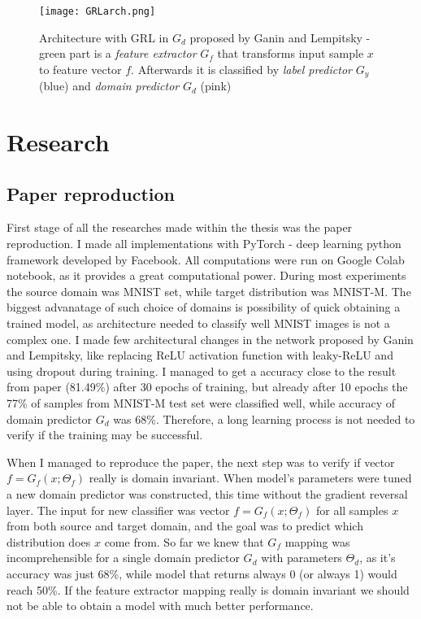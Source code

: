 \documentclass{article}
\begin{document}
\begin{figure}%
    \centering
    \texttt{[image: GRLarch.png]}%
    \caption{Architecture with GRL in $G_{d}$ proposed by Ganin and Lempitsky - green part is a \textit{feature extractor} $G_{f}$ that transforms input sample $x$ to feature vector $f$. Afterwards it is classified by \textit{label predictor} $G_{y}$ (blue) and \textit{domain predictor} $G_{d}$ (pink)}
    \label{fig:GRLarch}%
\end{figure}

\section{Research}
\subsection{Paper reproduction}
First stage of all the researches made within the thesis was the paper reproduction. I made all implementations with PyTorch - deep learning python framework developed by Facebook. All computations were run on Google Colab notebook, as it provides a great computational power. During most experiments the source domain was MNIST set, while target distribution was MNIST-M. The biggest advanatage of such choice of domains is possibility of quick obtaining a trained model, as architecture needed to classify well MNIST images is not a complex one. I made few architectural changes in the network proposed by Ganin and Lempitsky, like replacing ReLU activation function with leaky-ReLU and using dropout during training. I managed to get a accuracy close to the result from paper (81.49\%) after 30 epochs of training, but already after 10 epochs the 77\% of samples from MNIST-M test set were classified well, while accuracy of domain predictor $G_{d}$ was 68\%. Therefore, a long learning process is not needed to verify if the training may be successful.
\par
When I managed to reproduce the paper, the next step was to verify if vector $f=G_{f}(x;\Theta_{f})$ really is domain invariant. When model's parameters were tuned a new domain predictor was constructed, this time without the gradient reversal layer. The input for new classifier was  vector $f = G_{f}(x;\Theta_{f})$ for all samples $x$ from both source and target domain, and the goal was to predict which distribution does $x$ come from. So far we knew that $G_{f}$ mapping was incomprehensible for a single domain predictor $G_{d}$ with parameters $\Theta_{d}$, as it's accuracy was just 68\%, while model that returns always 0 (or always 1) would reach 50\%. If the feature extractor mapping really is domain invariant we should not be able to obtain a model with much better performance.
\end{document}
